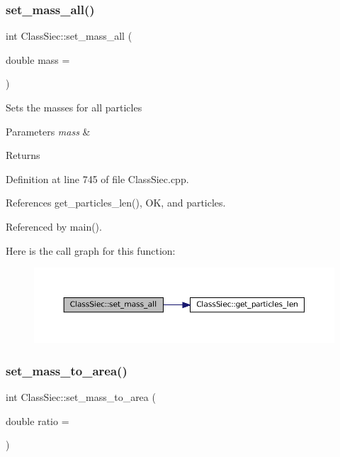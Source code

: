\subsubsection{\texorpdfstring{set\+\_\+mass\+\_\+all()}{set\_mass\_all()}}
{\footnotesize\ttfamily int Class\+Siec\+::set\+\_\+mass\+\_\+all (\begin{DoxyParamCaption}\item[{double}]{mass = {} }\end{DoxyParamCaption})}

Sets the masses for all particles 
\begin{DoxyParams}{Parameters}
{\em mass} & \\
\hline
\end{DoxyParams}
\begin{DoxyReturn}{Returns}

\end{DoxyReturn}


Definition at line 745 of file Class\+Siec.\+cpp.



References get\+\_\+particles\+\_\+len(), OK, and particles.



Referenced by main().

Here is the call graph for this function\+:
\nopagebreak
\begin{figure}[H]
\begin{center}
\leavevmode
\includegraphics[width=350pt]{classClassSiec_a2adaa0e7fe44a2a68b7eba11c52d21bd_cgraph}
\end{center}
\end{figure}
\mbox{\label{classClassSiec_aa2eff85fe7fc842b2d0631118d533154}} 
\subsubsection{\texorpdfstring{set\+\_\+mass\+\_\+to\+\_\+area()}{set\_mass\_to\_area()}}
{\footnotesize\ttfamily int Class\+Siec\+::set\+\_\+mass\+\_\+to\+\_\+area (\begin{DoxyParamCaption}\item[{double}]{ratio = {} }\end{DoxyParamCaption})}

